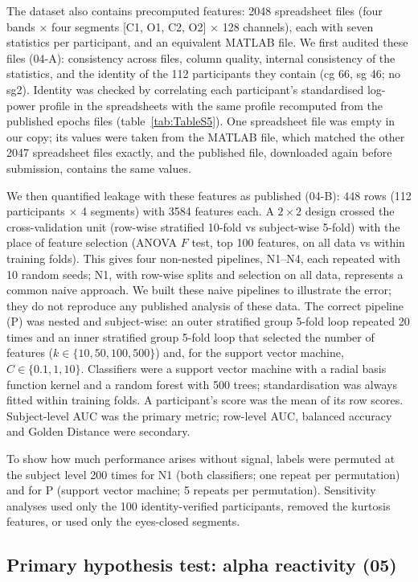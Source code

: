 The dataset also contains precomputed features: 2048 spreadsheet files (four bands $\times$ four segments [C1, O1, C2, O2] $\times$ 128 channels), each with seven statistics per participant, and an equivalent MATLAB file. We first audited these files (04-A): consistency across files, column quality, internal consistency of the statistics, and the identity of the 112 participants they contain (cg 66, sg 46; no sg2). Identity was checked by correlating each participant's standardised log-power profile in the spreadsheets with the same profile recomputed from the published epochs files (table~\ref{tab:TableS5}). One spreadsheet file was empty in our copy; its values were taken from the MATLAB file, which matched the other 2047 spreadsheet files exactly, and the published file, downloaded again before submission, contains the same values.

We then quantified leakage with these features as published (04-B): 448 rows (112 participants $\times$ 4 segments) with 3584 features each. A $2 \times 2$ design crossed the cross-validation unit (row-wise stratified 10-fold vs subject-wise 5-fold) with the place of feature selection (ANOVA $F$ test, top 100 features, on all data vs within training folds). This gives four non-nested pipelines, N1--N4, each repeated with 10 random seeds; N1, with row-wise splits and selection on all data, represents a common naive approach. We built these naive pipelines to illustrate the error; they do not reproduce any published analysis of these data. The correct pipeline (P) was nested and subject-wise: an outer stratified group 5-fold loop repeated 20 times and an inner stratified group 5-fold loop that selected the number of features ($k \in \{10, 50, 100, 500\}$) and, for the support vector machine, $C \in \{0.1, 1, 10\}$. Classifiers were a support vector machine with a radial basis function kernel and a random forest with 500 trees; standardisation was always fitted within training folds. A participant's score was the mean of its row scores. Subject-level AUC was the primary metric; row-level AUC, balanced accuracy and Golden Distance were secondary.

To show how much performance arises without signal, labels were permuted at the subject level 200 times for N1 (both classifiers; one repeat per permutation) and for P (support vector machine; 5 repeats per permutation). Sensitivity analyses used only the 100 identity-verified participants, removed the kurtosis features, or used only the eyes-closed segments.

\subsection{Primary hypothesis test: alpha reactivity (05)}
\label{sec:primary}

